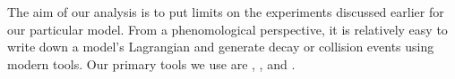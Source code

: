 \label{chapter:analysis}

The aim of our analysis is to put limits on the experiments discussed earlier for our particular model.
From a phenomological perspective, it is relatively easy to write down a model's Lagrangian and generate decay or collision events using modern tools.
Our primary tools we use are \feynrules \cite{Alloul:2013bka}, \feyncalc \cite{Mertig:1990an}, and \madgraph \cite{Alwall:2014hca}.

